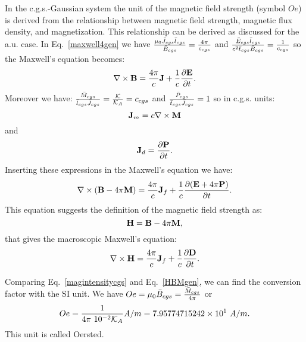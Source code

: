 \documentclass[12pt,a4paper]{article}
\def\htoh{7.95774715242\times 10^{1}}
\begin{document}
{\color{orange} In the c.g.s.-Gaussian system the unit of the magnetic field
strength (symbol $Oe$) is derived from the relationship between 
magnetic field strength,
magnetic flux density, and magnetization. This relationship can be derived
as discussed for the a.u. case. In Eq.~\ref{maxwell4gen} we have
${\mu_0 \bar J_{cgs} \bar l_{cgs} \over \bar B_{cgs}}={4 \pi \over c_{cgs}}$
and ${\bar E_{cgs} \bar l_{cgs} \over c^2 \bar t_{cgs} \bar B_{cgs}}=
{1\over c_{cgs}}$ so the Maxwell's equation becomes:
\begin{equation}
\nabla \times {\bf B}= {4 \pi \over c} {\bf J} + {1\over c} 
{\partial {\bf E} \over \partial t}.
\label{maxwell4cgs}
\end{equation}
Moreover we have:
${\bar M_{cgs} \over \bar l_{cgs} \bar J_{cgs}}={\mathcal{K}\over \mathcal{K}_A}=c_{cgs}$ and
${\bar P_{cgs} \over \bar t_{cgs} \bar J_{cgs}}=1$ so in c.g.s. units:
\begin{equation}
{\bf J}_m= c \nabla \times {\bf M}
\end{equation}
and
\begin{equation}
{\bf J}_d={\partial {\bf P} \over \partial t}.
\end{equation}
Inserting these expressions in the Maxwell's equation we have:
\begin{equation}
\nabla \times ({\bf B} -4\pi {\bf M})= 
{4 \pi\over c} {\bf J}_f +  {1\over c} {\partial ({\bf E}+4\pi {\bf P}) \over \partial t}.
\label{maxwell4cgs1}
\end{equation}
This equation suggests the definition of the magnetic field strength as:
\begin{equation}
{\bf H}={\bf B} -4\pi {\bf M},
\label{magintensitycgs}
\end{equation}
that gives the macroscopic Maxwell's equation:
\begin{equation}
\nabla \times {\bf H}= 
{4 \pi \over c} {\bf J}_f +  {1\over c}{\partial {\bf D} \over \partial t}.
\end{equation}

Comparing Eq.~\ref{magintensitycgs} and Eq.~\ref{HBMgen}, we can find the 
conversion factor with the SI unit.
We have $Oe=\mu_0 \bar B_{cgs}={\bar M_{cgs} \over 4 \pi}$ or
\begin{equation}
Oe= {1\over 4 \pi\ 10^{-2} \mathcal{K}_A} A/m=\htoh\ A/m. 
\end{equation}
This unit is called Oersted.
}
\\
\end{document}
